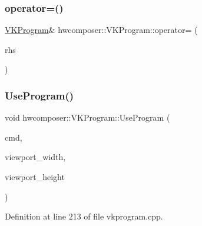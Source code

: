\subsubsection{\texorpdfstring{operator=()}{operator=()}}
{\footnotesize\ttfamily \mbox{\hyperlink{classhwcomposer_1_1VKProgram}{V\+K\+Program}}\& hwcomposer\+::\+V\+K\+Program\+::operator= (\begin{DoxyParamCaption}\item[{const \mbox{\hyperlink{classhwcomposer_1_1VKProgram}{V\+K\+Program}} \&}]{rhs }\end{DoxyParamCaption})\hspace{0.3cm}{\ttfamily [delete]}}

\mbox{\label{classhwcomposer_1_1VKProgram_a072cd6d43e404500c842cf120e431c52}} 
\subsubsection{\texorpdfstring{Use\+Program()}{UseProgram()}}
{\footnotesize\ttfamily void hwcomposer\+::\+V\+K\+Program\+::\+Use\+Program (\begin{DoxyParamCaption}\item[{const \mbox{\hyperlink{structhwcomposer_1_1RenderState}{Render\+State}} \&}]{cmd,  }\item[{unsigned int}]{viewport\+\_\+width,  }\item[{unsigned int}]{viewport\+\_\+height }\end{DoxyParamCaption})}



Definition at line 213 of file vkprogram.\+cpp.



